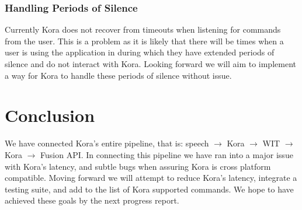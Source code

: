 \documentclass[onecolumn, draftclsnofoot,10pt, compsoc]{IEEEtran}
\begin{document}
    	\subsubsection{Handling Periods of Silence}	
		    Currently Kora does not recover from timeouts when listening for commands from the user.
		    This is a problem as it is likely that there will be times when a user is using the application in during which they have extended periods of silence and do not interact with Kora.
		    Looking forward we will aim to implement a way for Kora to handle these periods of silence without issue.


\section{Conclusion}
	We have connected Kora's entire pipeline, that is: speech $\rightarrow$ Kora $\rightarrow$ WIT $\rightarrow$ Kora $\rightarrow$ Fusion API.
	In connecting this pipeline we have ran into a major issue with Kora's latency, and subtle bugs when assuring Kora is cross platform compatible.
	Moving forward we will attempt to reduce Kora's latency, integrate a testing suite, and add to the list of Kora supported commands.
	We hope to have achieved these goals by the next progress report.
\end{document}
